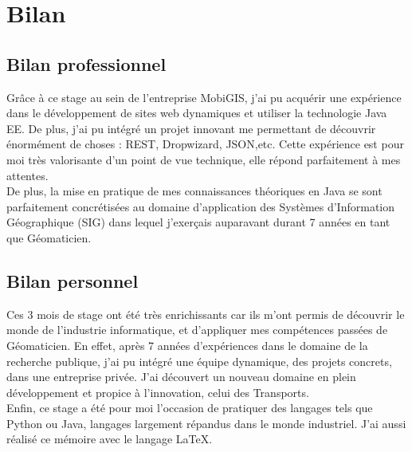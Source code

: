\chapter{Bilan}
\label{Bilan}


\section{Bilan professionnel}

Grâce à ce stage au sein de l'entreprise MobiGIS, j'ai pu acquérir une expérience dans le développement de sites web dynamiques et utiliser la technologie Java EE. De plus, j'ai pu intégré un projet innovant me permettant de découvrir énormément de choses : REST, Dropwizard, JSON,etc. Cette expérience est pour moi très valorisante d'un point de vue technique, elle répond parfaitement à mes attentes.\\

De plus, la mise en pratique de mes connaissances théoriques en Java se sont parfaitement concrétisées au domaine d'application des Systèmes d'Information Géographique (SIG) dans lequel j'exerçais auparavant durant 7 années en tant que Géomaticien. \\

\section{Bilan personnel}

Ces 3 mois de stage ont été très enrichissants car ils m'ont permis de découvrir le monde de l'industrie informatique, et d'appliquer mes compétences passées de Géomaticien. En effet, après 7 années d'expériences dans le domaine de la recherche publique, j'ai pu intégré une équipe dynamique, des projets concrets, dans une entreprise privée. J'ai découvert un nouveau domaine en plein développement et propice à l'innovation, celui des Transports. \\

Enfin, ce stage a été pour moi l'occasion de pratiquer des langages tels que Python ou Java, langages largement répandus dans le monde industriel. J'ai aussi réalisé ce mémoire avec le langage  \LaTeX{}.\\